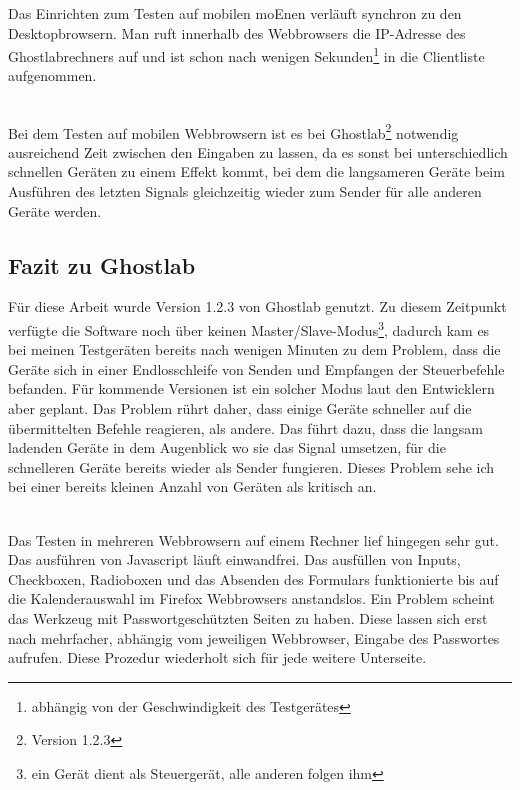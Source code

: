 		Das Einrichten zum Testen auf mobilen \Gls{moEn}en verläuft synchron zu den Desktopbrowsern. Man ruft innerhalb des \Gls{Webbrowser}s die IP-Adresse des Ghostlabrechners auf und ist schon nach wenigen Sekunden\footnote{abhängig von der Geschwindigkeit des Testgerätes} in die Clientliste aufgenommen.
		
		\\Bei dem Testen auf mobilen \Gls{Webbrowser}n ist es bei Ghostlab\footnote{Version 1.2.3} notwendig ausreichend Zeit zwischen den Eingaben zu lassen, da es sonst bei unterschiedlich schnellen Geräten zu einem Effekt kommt, bei dem die langsameren Geräte beim Ausführen des letzten Signals gleichzeitig wieder zum Sender für alle anderen Geräte werden.
		
		\pagebreak
		
		\subsection{Fazit zu Ghostlab}
		Für diese Arbeit wurde Version 1.2.3 von Ghostlab genutzt. Zu diesem Zeitpunkt verfügte die Software noch über keinen Master/Slave-Modus\footnote{ein Gerät dient als Steuergerät, alle anderen folgen ihm}, dadurch kam es bei meinen Testgeräten bereits nach wenigen Minuten zu dem Problem, dass die Geräte sich in einer Endlosschleife von Senden und Empfangen der Steuerbefehle befanden. Für kommende Versionen ist ein solcher Modus laut den Entwicklern aber geplant. Das Problem rührt daher, dass einige Geräte schneller auf die übermittelten Befehle reagieren, als andere. Das führt dazu, dass die langsam ladenden Geräte in dem Augenblick wo sie das Signal umsetzen, für die schnelleren Geräte bereits wieder als Sender fungieren. Dieses Problem sehe ich bei einer bereits kleinen Anzahl von Geräten als kritisch an. 

		\\Das Testen in mehreren \Gls{Webbrowser}n auf einem Rechner lief hingegen sehr gut. Das ausführen von \Gls{Javascript} läuft einwandfrei. Das ausfüllen von \Gls{Input}s, \Gls{Checkbox}en, \Gls{Radiobox}en und das Absenden des Formulars funktionierte bis auf die Kalenderauswahl im Firefox \Gls{Webbrowser}s anstandslos. Ein Problem scheint das Werkzeug mit Passwortgeschützten Seiten zu haben. Diese lassen sich erst nach mehrfacher, abhängig vom jeweiligen \Gls{Webbrowser}, Eingabe des Passwortes aufrufen. Diese Prozedur wiederholt sich für jede weitere Unterseite. 

